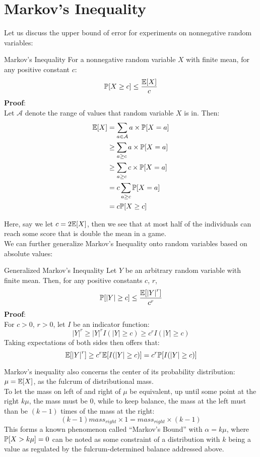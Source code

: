 \section{Markov's Inequality}
Let us discuss the upper bound of error for experiments on nonnegative random variables:
\begin{ln-theorem}{Markov's Inequality}{}
    For a nonnegative random variable $X$ with finite mean, for any positive constant $c$:
    \[
        \P[X \geq c] \leq \frac{\E[X]}{c}
    \]
    \tcblower
    \textbf{Proof}: \\
    Let $\mathcal{A}$ denote the range of values that random variable $X$ is in. Then:
    \begin{align*}
        \E[X]
        &= \sum_{a \in \mathcal{A}} a \times \P[X = a] \\
        &\geq \sum_{a \geq c} a \times \P[X = a] \\
        &\geq \sum_{a \geq c} c \times \P[X = a] \\
        &= c \sum_{a \geq c} \P[X = a] \\
        &= c \P[X \geq c]
    \end{align*}
\end{ln-theorem}
Here, say we let $c = 2 \E[X]$, then we see that at most half of the individuals can reach some score that is double the mean in a game. \\

We can further generalize Markov's Inequality onto random variables based on absolute values:
\begin{ln-theorem}{Generalized Markov's Inequality}{}
    Let $Y$ be an arbitrary random variable with finite mean. Then, for any positive constants $c$, $r$,
    \[
        \P[|Y| \geq c] \leq \frac{\E[{|Y|}^r]}{c^r}
    \]
    \tcblower
    \textbf{Proof}: \\
    For $c > 0$, $r > 0$, let $I$ be an indicator function:
    \[
        {|Y|}^r \geq {|Y|}^r I{(|Y| \geq c)} \geq c^r I{(|Y| \geq c)}
    \]
    Taking expectations of both sides then offers that:
    \[
        \E[{|Y|}^r] \geq c^r \E[I{(|Y| \geq c)}] = c^r \P[I{(|Y| \geq c)}]
    \]
\end{ln-theorem}
Markov's inequality also concerns the center of its probability distribution: $\mu = \E[X]$, as the fulcrum of distributional mass. \\
To let the mass on left of and right of $\mu$ be equivalent, up until some point at the right $k \mu$, the mass must be $0$, while to keep balance, the mass at the left must than be $(k - 1)$ times of the mass at the right:
\[(k - 1) {mass}_{right} \times 1 = {mass}_{right} \times (k - 1)\]
This forms a known phenomenon called ``Markov's Bound'' with $\alpha = k \mu$, where $\P[X > k\mu] = 0$ can be noted as some constraint of a distribution with $k$ being a value as regulated by the fulcrum-determined balance addressed above.

